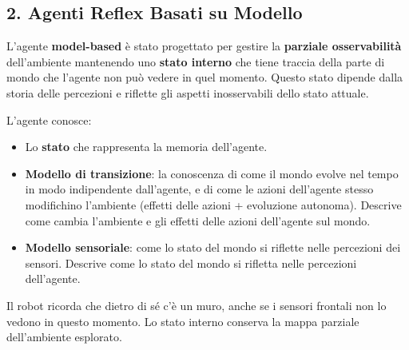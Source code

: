 \subsection{2. Agenti Reflex Basati su Modello}
L'agente \textbf{model-based} è stato progettato per gestire la \textbf{parziale osservabilità} dell'ambiente mantenendo uno \textbf{stato interno} che tiene traccia della parte di mondo che l'agente non può vedere in quel momento. Questo stato dipende dalla storia delle percezioni e riflette gli aspetti inosservabili dello stato attuale.

L'agente conosce:
\begin{itemize}
    \item Lo \textbf{stato} che rappresenta la memoria dell'agente.
    \item \textbf{Modello di transizione}: la conoscenza di come il mondo evolve nel tempo in modo indipendente dall'agente, e di come le azioni dell'agente stesso modifichino l'ambiente (effetti delle azioni + evoluzione autonoma). Descrive come cambia l'ambiente e gli effetti delle azioni dell'agente sul mondo.
    \item \textbf{Modello sensoriale}: come lo stato del mondo si riflette nelle percezioni dei sensori. Descrive come lo stato del mondo si rifletta nelle percezioni dell'agente.
\end{itemize}

\begin{exbox}
Il robot ricorda che dietro di sé c'è un muro, anche se i sensori frontali non lo vedono in questo momento. Lo stato interno conserva la mappa parziale dell'ambiente esplorato.
\end{exbox}




